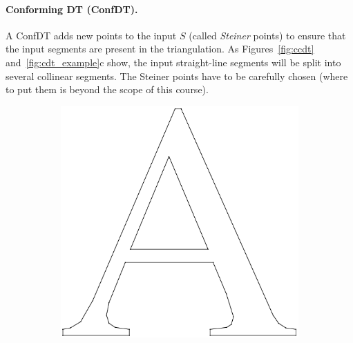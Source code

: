 \paragraph*{Conforming DT (ConfDT).}
A ConfDT adds new points to the input $S$ (called \emph{Steiner} points) to ensure that the input segments are present in the triangulation. 
As Figures~\ref{fig:ccdt} and~\ref{fig:cdt_example}c show, the input straight-line segments will be split into several collinear segments. 
The Steiner points have to be carefully chosen (where to put them is beyond the scope of this course).
\begin{figure}
  \centering
  \begin{subfigure}[b]{0.3\linewidth}
    \includegraphics[width=\textwidth]{figs/cdt_input.pdf}
    \caption{}
  \end{subfigure}%
  \qquad
  \begin{subfigure}[b]{0.3\linewidth}

\end{subfigure}
\end{figure}
